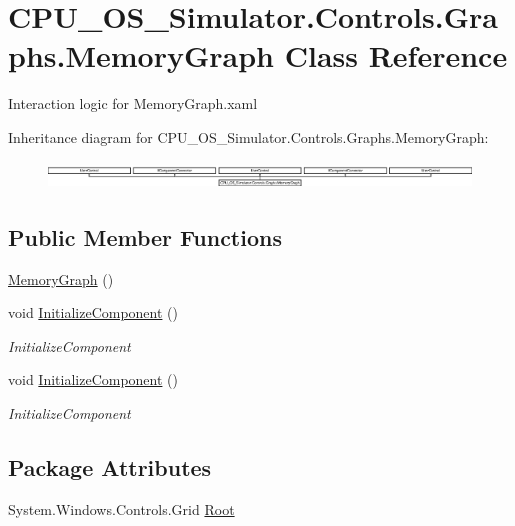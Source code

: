 \hypertarget{class_c_p_u___o_s___simulator_1_1_controls_1_1_graphs_1_1_memory_graph}{}\section{C\+P\+U\+\_\+\+O\+S\+\_\+\+Simulator.\+Controls.\+Graphs.\+Memory\+Graph Class Reference}
\label{class_c_p_u___o_s___simulator_1_1_controls_1_1_graphs_1_1_memory_graph}


Interaction logic for Memory\+Graph.\+xaml  


Inheritance diagram for C\+P\+U\+\_\+\+O\+S\+\_\+\+Simulator.\+Controls.\+Graphs.\+Memory\+Graph\+:\begin{figure}[H]
\begin{center}
\leavevmode
\includegraphics[height=0.722581cm]{class_c_p_u___o_s___simulator_1_1_controls_1_1_graphs_1_1_memory_graph}
\end{center}
\end{figure}
\subsection*{Public Member Functions}
\begin{DoxyCompactItemize}
\item 
\hyperlink{class_c_p_u___o_s___simulator_1_1_controls_1_1_graphs_1_1_memory_graph_ac5c79c29c215a897c7446df47519d238}{Memory\+Graph} ()
\item 
void \hyperlink{class_c_p_u___o_s___simulator_1_1_controls_1_1_graphs_1_1_memory_graph_a5a5ad5059554eb0f53a7a6b4fd0a2932}{Initialize\+Component} ()
\begin{DoxyCompactList}\small\item\em Initialize\+Component \end{DoxyCompactList}\item 
void \hyperlink{class_c_p_u___o_s___simulator_1_1_controls_1_1_graphs_1_1_memory_graph_a5a5ad5059554eb0f53a7a6b4fd0a2932}{Initialize\+Component} ()
\begin{DoxyCompactList}\small\item\em Initialize\+Component \end{DoxyCompactList}\end{DoxyCompactItemize}
\subsection*{Package Attributes}
\begin{DoxyCompactItemize}
\item 
System.\+Windows.\+Controls.\+Grid \hyperlink{class_c_p_u___o_s___simulator_1_1_controls_1_1_graphs_1_1_memory_graph_a8d150d903f462523d77188c9a04ea5c3}{Root}
\end{DoxyCompactItemize}

